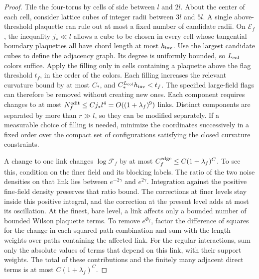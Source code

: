 \documentclass[11pt,a4paper]{article}
\numberwithin{equation}{section}
\begin{document}
\begin{proof}
Tile the four-torus by cells of side between \(l\) and \(2l\). About the center of each cell, consider lattice cubes of integer radii between \(3l\) and \(5l\). A single above-threshold plaquette can rule out at most a fixed number of candidate radii. On \(\mathcal E_f\), the inequality \(j_*\ll l\) allows a cube to be chosen in every cell whose tangential boundary plaquettes all have chord length at most \(h_{\rm inv}\). Use the largest candidate cubes to define the adjacency graph. Its degree is uniformly bounded, so \(L_{\rm col}\) colors suffice. Apply the filling only in cells containing a plaquette above the flag threshold \(t_f\), in the order of the colors. Each filling increases the relevant curvature bound by at most \(C_*\), and \(C_*^{L_{\rm col}}h_{\rm inv}<t_f\). The specified large-field flags can therefore be removed without creating new ones. Each component requires changes to at most \(N_f^{\rm edit}\le Cj_*l^4=O((1+\lambda_f)^9)\) links. Distinct components are separated by more than \(r\gg l\), so they can be modified separately. If a measurable choice of filling is needed, minimize the coordinates successively in a fixed order over the compact set of configurations satisfying the closed curvature constraints.

A change to one link changes \(\log\mathcal F_f\) by at most \(C_f^{\rm edge}\le C(1+\lambda_f)^C\). To see this, condition on the finer field and its blocking labels. The ratio of the two noise densities on that link lies between \(e^{-2\gamma}\) and \(e^{2\gamma}\). Integration against the positive fine-field density preserves that ratio bound. The corrections at finer levels stay inside this positive integral, and the correction at the present level adds at most its oscillation. At the finest, bare level, a link affects only a bounded number of bounded Wilson plaquette terms. To remove \(e^{\Phi_f}\), factor the difference of squares for the change in each squared path combination and sum with the length weights over paths containing the affected link. For the regular interactions, sum only the absolute values of terms that depend on this link, with their support weights. The total of these contributions and the finitely many adjacent direct terms is at most \(C(1+\lambda_f)^C\).


\end{proof}
\end{document}
